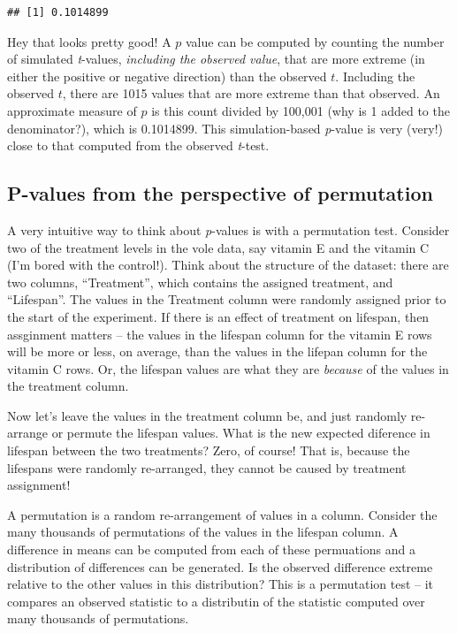 \documentclass[]{book}
\begin{document}
\begin{verbatim}
## [1] 0.1014899
\end{verbatim}

Hey that looks pretty good! A \(p\) value can be computed by counting the number of simulated \emph{t}-values, \emph{including the observed value}, that are more extreme (in either the positive or negative direction) than the observed \(t\). Including the observed \(t\), there are 1015 values that are more extreme than that observed. An approximate measure of \(p\) is this count divided by 100,001 (why is 1 added to the denominator?), which is 0.1014899. This simulation-based \emph{p}-value is very (very!) close to that computed from the observed \emph{t}-test.

\hypertarget{p-values-from-the-perspective-of-permutation}{%
\subsection{P-values from the perspective of permutation}\label{p-values-from-the-perspective-of-permutation}}

A very intuitive way to think about \emph{p}-values is with a permutation test. Consider two of the treatment levels in the vole data, say vitamin E and the vitamin C (I'm bored with the control!). Think about the structure of the dataset: there are two columns, ``Treatment'', which contains the assigned treatment, and ``Lifespan''. The values in the Treatment column were randomly assigned prior to the start of the experiment. If there is an effect of treatment on lifespan, then assginment matters -- the values in the lifespan column for the vitamin E rows will be more or less, on average, than the values in the lifepan column for the vitamin C rows. Or, the lifespan values are what they are \emph{because} of the values in the treatment column.

Now let's leave the values in the treatment column be, and just randomly re-arrange or permute the lifespan values. What is the new expected diference in lifespan between the two treatments? Zero, of course! That is, because the lifespans were randomly re-arranged, they cannot be caused by treatment assignment!

A permutation is a random re-arrangement of values in a column. Consider the many thousands of permutations of the values in the lifespan column. A difference in means can be computed from each of these permuations and a distribution of differences can be generated. Is the observed difference extreme relative to the other values in this distribution? This is a permutation test -- it compares an observed statistic to a distributin of the statistic computed over many thousands of permutations.
\end{document}
